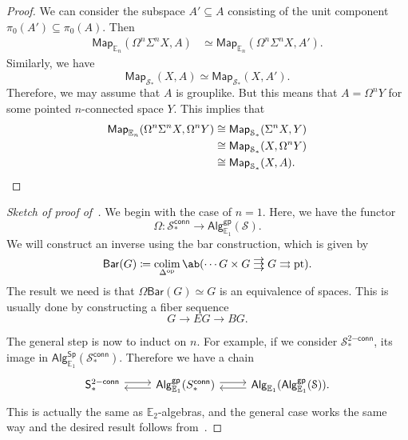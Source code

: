 \documentclass[10pt]{amsart}
\theoremstyle{definition}
\theoremstyle{remark}
\theoremstyle{plain}
\theoremstyle{definition}
\theoremstyle{remark}
\newcommand{\E}{\mathbb{E}}
\newcommand{\mc}[1]{\mathcal{#1}}
\newcommand{\mr}[1]{\mathrm{#1}}
\newcommand{\ms}[1]{\mathsf{#1}}
\newcommand{\1}{\mathbf{1}}
\newcommand{\2}{\mathbf{2}}
\newcommand{\3}{\mathbf{3}}
\newcommand{\pt}{\mr{pt}}
\newcommand*{\triple}[2][.1ex]{%
    \mathrel{\vcenter{\offinterlineskip%
    \hbox{$#2$}\vskip#1\hbox{$#2$}\vskip#1\hbox{$#2$}}}}
\DeclareMathOperator{\op}{op}
\DeclareMathOperator*{\colim}{colim}
\begin{document}
\begin{proof}
    We can consider the subspace $A' \subseteq A$ consisting of the unit component $\pi_0(A') \subseteq \pi_0(A)$. Then
    \begin{align*}
        \ms{Map}_{\E_n}(\Omega^n \Sigma^n X, A) &\simeq \ms{Map}_{\E_n} (\Omega^n \Sigma^n X, A').
    \end{align*}
    Similarly, we have
    \[ \ms{Map}_{\mc{S}_*}(X, A) \simeq \ms{Map}_{\mc{S}_*}(X, A'). \]
    Therefore, we may assume that $A$ is grouplike. But this means that $A = \Omega^n Y$ for some pointed $n$-connected space $Y$. This implies that
    \begin{align*}
        \ms{Map}_{\E_n}(\Omega^n \Sigma^n X, \Omega^n Y) &\cong \ms{Map}_{\mc{S}_*} (\Sigma^n X, Y) \\
        &\cong \ms{Map}_{\mc{S}_*}(X, \Omega^n Y) \\
        &\cong \ms{Map}_{\mc{S}_*}(X, A). \qedhere
    \end{align*}
\end{proof}

\begin{proof}[Sketch of proof of~]
    We begin with the case of $n=1$. Here, we have the functor
    \[ \Omega \colon \mc{S}_*^{\ms{conn}} \to \ms{Alg}_{\E_1}^{\ms{gp}}(\mc{S}). \]
    We will construct an inverse using the bar construction, which is given by
    \[ \ms{Bar}(G) \coloneqq \colim_{\Delta^{\op}} \ab(\cdots G \times G \triple{\to} G \rightrightarrows \pt). \]
    The result we need is that $\Omega \ms{Bar}(G) \simeq G$ is an equivalence of spaces. This is usually done by constructing a fiber sequence
    \[ G \to EG \to BG. \]

    The general step is now to induct on $n$. For example, if we consider $\mc{S}_*^{2\ms{-conn}}$, its image in $\ms{Alg}_{\E_1}^{\ms{Sp}}(\mc{S}_*^{\ms{conn}})$. Therefore we have a chain
    \begin{equation*}
    \begin{tikzcd}
        \ms{S}_*^{2\ms{-conn}} \ar[shift left=1]{r} & \ms{Alg}_{\E_1}^{\ms{gp}} (S_*^{\ms{conn}})\ar[shift left=1]{r} \ar[shift left=1]{l} & \ms{Alg}_{\E_1}(\ms{Alg}_{\E_1}^{\ms{gp}}(\mc{S})). \ar[shift left=1]{l}
    \end{tikzcd}
    \end{equation*}
    This is actually the same as $\E_2$-algebras, and the general case works the same way and the desired result follows from~.
\end{proof}
\end{document}
